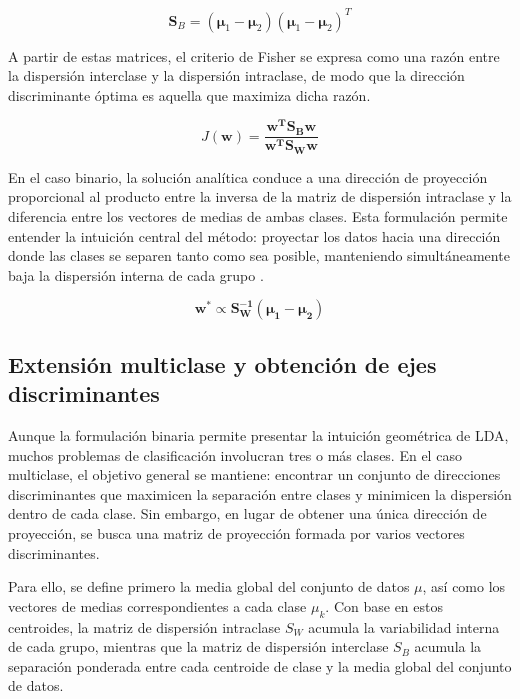 \begin{equation}
	\mathbf{S}_B = (\mathbf{\mu}_1 - \mathbf{\mu}_2)(\mathbf{\mu}_1 - \mathbf{\mu}_2)^T
	\label{eq:EMT2.1}
\end{equation}



A partir de estas matrices, el criterio de Fisher se expresa como una razón entre la dispersión interclase y la dispersión intraclase, de modo que la dirección discriminante óptima es aquella que maximiza dicha razón.

\begin{equation}
	J\mathbf{(w)} = \mathbf{\frac{w^TS_Bw}{w^TS_Ww}}	
	\label{eq:EMT3}
\end{equation}

En el caso binario, la solución analítica conduce a una dirección de proyección proporcional al producto entre la inversa de la matriz de dispersión intraclase y la diferencia entre los vectores de medias de ambas clases. Esta formulación permite entender la intuición central del método: proyectar los datos hacia una dirección donde las clases se separen tanto como sea posible, manteniendo simultáneamente baja la dispersión interna de cada grupo \cite{bishop2006pattern}.

\begin{equation}
	\mathbf{w^*} \propto \mathbf{S_W^{-1}(\mu_1-\mu_2)}
	\label{eq:EMT4}
\end{equation}

\subsection{Extensión multiclase y obtención de ejes discriminantes}

Aunque la formulación binaria permite presentar la intuición geométrica de LDA, muchos problemas de clasificación involucran tres o más clases. En el caso multiclase, el objetivo general se mantiene: encontrar un conjunto de direcciones discriminantes que maximicen la separación entre clases y minimicen la dispersión dentro de cada clase. Sin embargo, en lugar de obtener una única dirección de proyección, se busca una matriz de proyección formada por varios vectores discriminantes.

Para ello, se define primero la media global del conjunto de datos $\mu$, así como los vectores de medias correspondientes a cada clase $\mu_k$. Con base en estos centroides, la matriz de dispersión intraclase $S_W$ acumula la variabilidad interna de cada grupo, mientras que la matriz de dispersión interclase $S_B$ acumula la separación ponderada entre cada centroide de clase y la media global del conjunto de datos.

